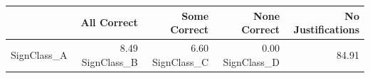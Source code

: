 \begin{tabular}{lrrrr}
\toprule
 & All Correct & Some Correct & None Correct & No Justifications \\
\midrule
SignClass_A & 8.49%
SignClass_B & 6.60%
SignClass_C & 0.00%
SignClass_D & 84.91%
\bottomrule
\end{tabular}
